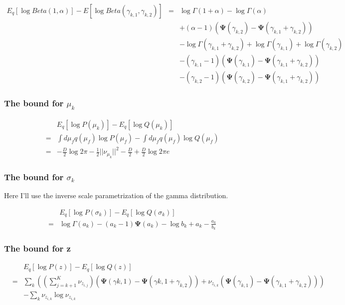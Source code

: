 \documentclass{article}
\newcommand{\digamma}{\bm{\Psi}}
\newcommand{\m}[1]{\nu_{#1}}
\begin{document}
\begin{eqnarray*}
  E_q[\log Beta(1,\alpha)] - E[\log Beta(\gamma_{k,1},\gamma_{k,2})] 
  &=&
  \log \Gamma(1+\alpha) - \log \Gamma(\alpha) \\ && 
  +(\alpha-1)(\digamma(\gamma_{k,2})-\digamma(\gamma_{k,1}+\gamma_{k,2})) \\ &&
  - \log \Gamma(\gamma_{k,1}+\gamma_{k,2}) + \log \Gamma(\gamma_{k,1}) +
  \log \Gamma(\gamma_{k,2}) \\ &&
  -
  (\gamma_{k,1}-1)(\digamma(\gamma_{k,1})-\digamma(\gamma_{k,1}+\gamma_{k,2}))
  \\ &&
  -
  (\gamma_{k,2}-1)(\digamma(\gamma_{k,2})-\digamma(\gamma_{k,1}+\gamma_{k,2}))  
\end{eqnarray*}

\subsubsection{The bound for $\mu_k$}
\label{sec:bound-mu_k}

 \begin{eqnarray*}
  && E_q[\log P(\mu_k)] - E_q[\log Q(\mu_k)] \\
  &=&
  \int\!d\mu_f q(\mu_f) \log P(\mu_f)
    - \int\!d\mu_f q(\mu_f) \log Q(\mu_f)  \\
    &=&
- \frac{D}{2}\log 2\pi - \frac{1}{2} ||\m{\mu_k}||^2 - \frac{D}{2}
+ \frac{D}{2} \log 2\pi e 
\end{eqnarray*}

\subsubsection{The bound for $\sigma_k$}
\label{sec:bound-sigma_k}

Here I'll use the inverse scale parametrization of the gamma
distribution.


\begin{eqnarray*}
  && E_q[\log P(\sigma_k)] - E_q [\log Q(\sigma_k)] \\ &=&
  \log \Gamma (a_k) - (a_k-1)\digamma(a_k) -\log b_k + a_k - \frac{a_k}{b_k}
\end{eqnarray*}



\subsubsection{The bound for z}
\label{sec:bound-z}

\begin{eqnarray*}
  && E_q[\log P(z)] - E_q[\log Q(z)] \\
  &=&
  \sum_{k} \left( \left(\sum_{j=k+1}^K
      \m{z_{i,j}}\right)(\digamma(\gamma{k,1})-\digamma(\gamma{k,1}+\gamma_{k,2})) 
    +
    \m{z_{i,k}}(\digamma(\gamma_{k,1})-\digamma(\gamma_{k,1}+\gamma_{k,2}))\right)
  \\ &&
  - \sum_k
  \m{z_{i,k}} \log \m{z_{i,k}} \\
\end{eqnarray*}
\end{document}
